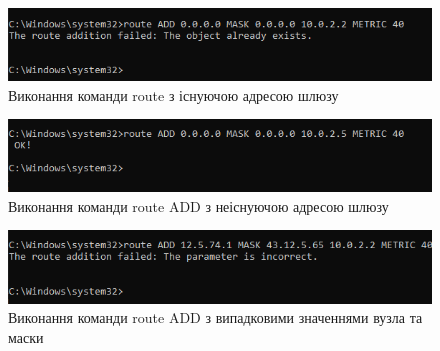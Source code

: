 \documentclass{article}
\begin{document}
\begin{normalsize}
\begin{figure}[H]
	\centering
	\includegraphics[width=\textwidth]{32}
	\caption{Виконання команди route з існуючою адресою шлюзу}
\end{figure}

\begin{figure}[H]
	\centering
	\includegraphics[width=\textwidth]{33}
	\caption{Виконання команди route ADD з неіснуючою адресою шлюзу}
\end{figure}

\begin{figure}[H]
	\centering
	\includegraphics[width=\textwidth]{34}
	\caption{Виконання команди route ADD з випадковими значеннями вузла та маски}
\end{figure}


\end{normalsize}
\end{document}
